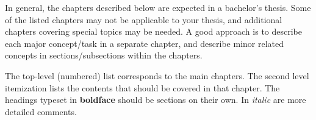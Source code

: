 
\abstract

In general, the chapters described below are expected in a bachelor's thesis.
Some of the listed chapters may not be applicable to your thesis, and additional chapters covering special topics may be needed.
A good approach is to describe each major concept/task in a separate chapter, and describe minor related concepts in sections/subsections within the chapters.

The top-level (numbered) list corresponds to the main chapters.
The second level itemization lists the contents that should be covered in that chapter.
The headings typeset in \textbf{boldface} should be sections on their own.
In \emph{italic} are more detailed comments.

\lipsum[3]
